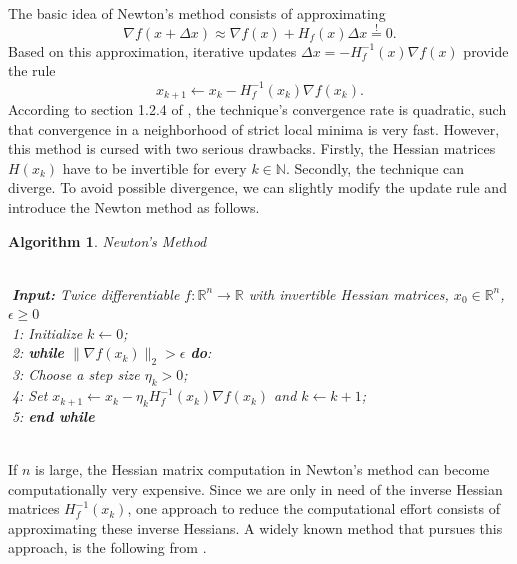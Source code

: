 \documentclass[11pt, a4paper]{article}
\newtheorem{algorithm}[theorem]{Algorithm}
\newcommand{\N}{\mathbb{N}}
\newcommand{\R}{\mathbb{R}}
\begin{document}
The basic idea of Newton's method consists of approximating
\[ \nabla f(x+ \Delta x) \approx \nabla f(x) + H_f(x) \Delta x \stackrel{!}{=} 0. \]
Based on this approximation, iterative updates $ \Delta x = - H_f^{-1}(x) \nabla f(x)$ provide the rule
\[ x_{k+1} \leftarrow x_k - H_f^{-1}(x_k) \nabla f(x_k). \]
According to section 1.2.4 of \cite{ConvexOptimization}, the technique's convergence rate is quadratic, such that convergence in a neighborhood of strict local minima is very fast. However, this method is cursed with two serious drawbacks. Firstly, the Hessian matrices $H(x_k)$ have to be invertible for every $k \in \N$. Secondly, the technique can diverge. To avoid possible divergence, we can slightly modify the update rule and introduce the Newton method as follows.

\begin{algorithm}
\caption{Newton's Method \textcolor{white}{$\Big |$}} \ \\
\textcolor{white}{$\Big |$}\textbf{Input:} Twice differentiable $f: \R^n \to \R$ with invertible Hessian matrices, $x_0 \in \R^n$, $\epsilon \geq 0$ \\
\textcolor{white}{$\Big |$}1: Initialize $k \leftarrow 0$; \\
\textcolor{white}{$\Big |$}2: \textbf{while} $ \big \| \nabla f(x_k) \big \|_2 > \epsilon $ \textbf{do}: \\
\textcolor{white}{$\Big |$}3: \quad Choose a step size $\eta_k > 0$; \\
\textcolor{white}{$\Big |$}4: \quad Set $x_{k+1} \leftarrow x_k - \eta_k H_f^{-1}(x_k) \nabla f(x_k)$ and $k \leftarrow k+1$; \\
\textcolor{white}{$\Big |$}5: \textbf{end while}
\end{algorithm}
\ \\

If $n$ is large, the Hessian matrix computation in Newton's method can become computationally very expensive. Since we are only in need of the inverse Hessian matrices $H_f^{-1}(x_k)$, one approach to reduce the computational effort consists of approximating these inverse Hessians. A widely known method that pursues this approach, is the following from \cite{BFGS}.
\end{document}
